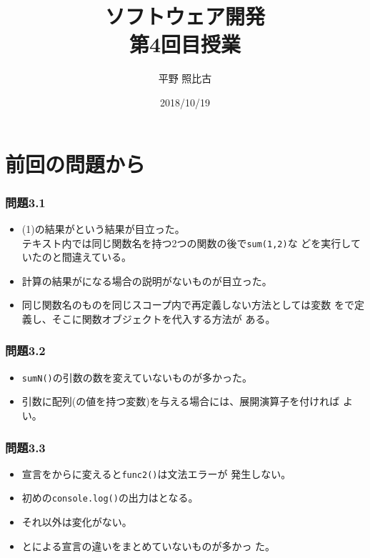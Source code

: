 
%
\title{ソフトウェア開発\\第4回目授業}
\author{平野 照比古}
\institute{}
\date{2018/10/19}

\frame{\maketitle}
\section{前回の問題から}
 \begin{frame}[containsverbatim]
  \frametitle{問題3.1}
  \begin{itemize}
   \item (1)の結果がという結果が目立った。\\
         テキスト内では同じ関数名を持つ2つの関数の後で\Verb+sum(1,2)+な
         どを実行していたのと間違えている。
   \item 計算の結果がになる場合の説明がないものが目立った。
   \item 同じ関数名のものを同じスコープ内で再定義しない方法としては変数
         をで定義し、そこに関数オブジェクトを代入する方法が
         ある。
  \end{itemize}
 \end{frame}
\begin{frame}[containsverbatim]
 \frametitle{問題3.2}
 \begin{itemize}
  \item \texttt{sumN()}の引数の数を変えていないものが多かった。
  \item 引数に配列(の値を持つ変数)を与える場合には、展開演算子を付ければ
        よい。
 \end{itemize}
\end{frame}
\begin{frame}[containsverbatim]
 \frametitle{問題3.3}
 \begin{itemize}
  \item 宣言をからに変えると\texttt{func2()}は文法エラーが
 発生しない。
  \item 初めの\Verb+console.log()+の出力はとなる。
  \item それ以外は変化がない。
  \item {}とによる宣言の違いをまとめていないものが多かっ
        た。
 \end{itemize}
\end{frame}
